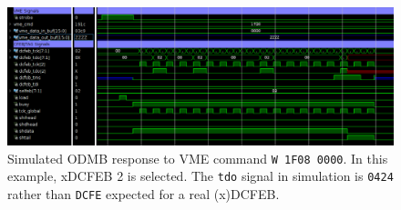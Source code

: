 \documentclass[10pt,a4paper]{article}
\begin{document}
\begin{figure}[H]
\centering
\includegraphics[width= 1.0 \textwidth]{figures/cfebjtag_1f08.png}
\caption{Simulated ODMB response to VME command \texttt{W 1F08 0000}. In this example, xDCFEB 2 is selected. The \texttt{tdo} signal in simulation is \texttt{0424} rather than \texttt{DCFE}
expected for a real (x)DCFEB.}
\label{fig:jtag1f08}
\end{figure}
\end{document}
